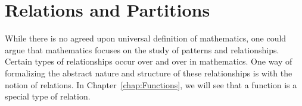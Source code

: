 \chapter{Relations and Partitions}\label{chap:Relations_and_Partitions}


While there is no agreed upon universal definition of mathematics, one could argue that mathematics focuses on the study of patterns and relationships. Certain types of relationships occur over and over in mathematics.  One way of formalizing the abstract nature and structure of these relationships is with the notion of relations. In Chapter~\ref{chap:Functions}, we will see that a function is a special type of relation.